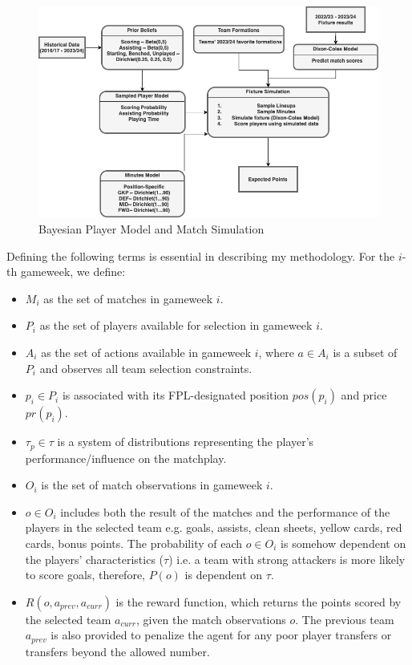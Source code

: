 \begin{figure}[h]
    \centering
    \includegraphics[width=1.2\textwidth]{figs/Bayesian_player_model_Match_simulation.png}
    \vskip 0.2in
    \caption{Bayesian Player Model and Match Simulation}
    \label{fig:bayesian_model_and_simulation}
\end{figure}

Defining the following terms is essential in describing my methodology. For the $i$-th gameweek, we define:
\begin{itemize}
    \item $M_i$ as the set of matches in gameweek $i$.
    \item $P_i$ as the set of players available for selection in gameweek $i$.
    \item $A_i$ as the set of actions available in gameweek $i$, where $a \in A_i$ is a subset of $P_i$ and observes all team selection constraints.
    \item $p_i \in P_i$ is associated with its FPL-designated position $pos(p_i)$ and price $pr(p_i)$.
    \item $\tau_p \in \tau$ is a system of distributions representing the player's performance/influence on the matchplay.
    \item $O_i$ is the set of match observations in gameweek $i$.
    \item $o \in O_i$ includes both the result of the matches and the performance of the players in the selected team e.g. goals, assists, clean sheets, yellow cards, red cards, bonus points. The probability of each $o \in O_i$ is somehow dependent on the players' characteristics ($\tau$) i.e. a team with strong attackers is more likely to score goals, therefore, $P(o)$ is dependent on $\tau$.
    \item $R(o, a_{prev}, a_{curr})$ is the reward function, which returns the points scored by the selected team $a_{curr}$, given the match observations $o$. The previous team $a_{prev}$ is also provided to penalize the agent for any poor player transfers or transfers beyond the allowed number.
\end{itemize}

